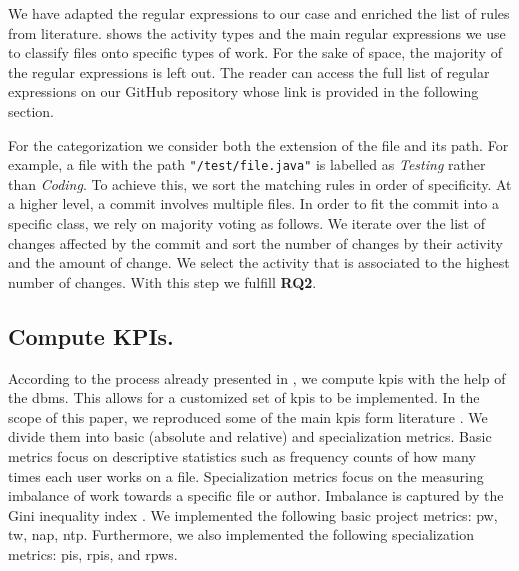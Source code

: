 

We have adapted the regular expressions to our case and enriched the list of rules from literature.  shows the activity types and the main regular expressions we use to classify files onto specific types of work. For the sake of space, the majority of the regular expressions is left out. The reader can access the full list of regular expressions on our GitHub repository whose link is provided in the following section.


For the categorization we consider both the extension of the file and its path. For example, a file with the path \lstinline{"/test/file.java"} is labelled as \textsl{Testing} rather than \textsl{Coding}. To achieve this, we sort the matching rules in order of specificity. 
At a higher level, a commit involves multiple files. In order to fit the commit into a specific class, we rely on majority voting as follows. We iterate over the list of changes affected by the commit and sort the number of changes by their activity and the amount of change. We select the activity that is associated to the highest number of changes. With this step we fulfill \textbf{RQ2}.

\subsection{Compute KPIs.}

According to the process already presented in , we compute \glspl{kpi} with the help of the \gls{dbms}. This allows for a customized set of \glspl{kpi} to be implemented. In the scope of this paper, we reproduced some of the main \glspl{kpi} form literature \citep{DBLP:journals/ese/VasilescuSGM14}. We divide them into basic (absolute and relative) and specialization metrics. Basic metrics focus on descriptive statistics such as frequency counts of how many times each user works on a file. Specialization metrics focus on the measuring imbalance of work towards a specific file or author. Imbalance is captured by the Gini inequality index \citep{gini1921measurement}.
We implemented the following basic project metrics: \gls{pw}, \gls{tw}, \gls{nap}, \gls{ntp}. Furthermore, we also implemented the following specialization metrics: \gls{pis}, \gls{rpis}, and \gls{rpws}. 

